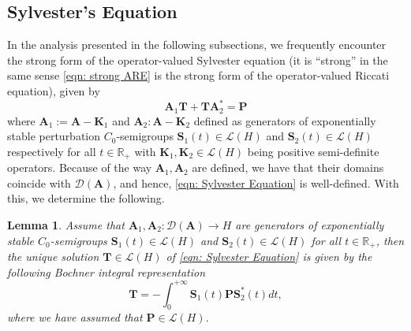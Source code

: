 \documentclass{amsart}
\newcommand{\sL}{\mathscr L}
\newcommand{\p}[1]{\left( {#1} \right)}
\newcommand{\bA}{\mathbf A}
\newcommand{\bS}{\mathbf S}
\newcommand{\bT}{\mathbf T}
\newtheorem{lemma}{Lemma}
\begin{document}
\subsection{Sylvester's Equation}
In the analysis presented in the following subsections, we frequently encounter the strong form of the operator-valued Sylvester equation (it is ``strong'' in the same sense \eqref{eqn: strong ARE} is the strong form of the operator-valued Riccati equation), given by 
\begin{equation} \label{eqn: Sylvester Equation}
    \bA_1 \bT + \bT \bA_2^* = \mathbf P
\end{equation}
where $\bA_1:= \bA - \mathbf K_1$ and $\bA_2: \bA - \mathbf K_2$ defined as generators of exponentially stable perturbation $C_0$-semigroups $\bS_1(t) \in \sL\p{H}$ and $\bS_2(t) \in \sL\p{H}$ respectively for all $t \in \mathbb R_+$  with $\mathbf K_1, \mathbf K_2 \in \sL\p{H}$ being positive semi-definite operators. Because of the way $\bA_1, \bA_2$ are defined, we have that their domains coincide with $\mathcal D(\bA)$, and hence, \eqref{eqn: Sylvester Equation} is well-defined. With this, we determine the following.
\begin{lemma} \label{lemma: Sylvester Equation}
    Assume that $\bA_1, \bA_2: \mathcal D(\bA) \rightarrow H$ are generators of exponentially stable $C_0$-semigroups $\bS_1(t) \in \sL\p{H}$ and $\bS_2(t) \in \sL\p{H}$ for all $t \in \mathbb R_+$, then the unique solution $\mathbf T \in \sL\p{H}$ of \eqref{eqn: Sylvester Equation} is given by the following Bochner integral representation
    \begin{equation} \label{eqn: sylvester solution}
        \bT = - \int_0^{+\infty} \bS_1(t)\mathbf P \bS_2^*(t)dt,
    \end{equation}
    where we have assumed that $\mathbf P \in \sL\p{H}$.
\end{lemma}
\end{document}
